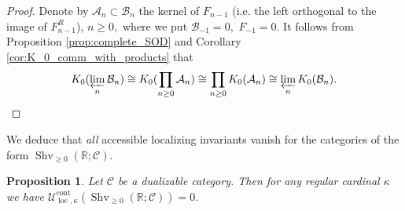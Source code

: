 \documentclass[11pt,leqno]{amsart}
\newtheorem{prop}[theo]{Proposition}
\numberwithin{equation}{section}
\def\R{\mathbb{R}}
\newcommand{\prolim}[1][]{\mathop{\varprojlim}\limits_{#1}}
\newcommand{\prodd}[1][]{\mathop{\prod}\limits_{#1}}
\newcommand{\loc}{\operatorname{loc}}
\newcommand{\cont}{\operatorname{cont}}
\newcommand{\cA}{{\mathcal A}}
\newcommand{\cB}{{\mathcal B}}
\newcommand{\cC}{{\mathcal C}}
\newcommand{\cU}{{\mathcal U}}
\newcommand{\Sh}{\operatorname{Shv}}
\begin{document}
\begin{proof}Denote by $\cA_n\subset\cB_n$ the kernel of $F_{n-1}$ (i.e. the left orthogonal to the image of $F_{n-1}^R$), $n\geq 0,$ where we put $\cB_{-1}=0,$ $F_{-1}=0.$ It follows from Proposition \ref{prop:complete_SOD} and Corollary \ref{cor:K_0_comm_with_products} that
\begin{equation*}K_0(\prolim[n]\cB_n)\cong K_0(\prodd[n\geq 0]\cA_n)\cong \prodd[n\geq 0]K_0(\cA_n)\cong\prolim[n]K_0(\cB_n).\qedhere\end{equation*}\end{proof}

We deduce that {\it all} accessible localizing invariants vanish for the categories of the form $\Sh_{\geq 0}(\R;\cC).$

\begin{prop}\label{prop:all_loc_invar_zero_for_Sh_geq_0} Let $\cC$ be a dualizable category. Then for any regular cardinal $\kappa$ we have
$\cU_{\loc,\kappa}^{\cont}(\Sh_{\geq 0}(\R;\cC))=0.$\end{prop}
\end{document}
